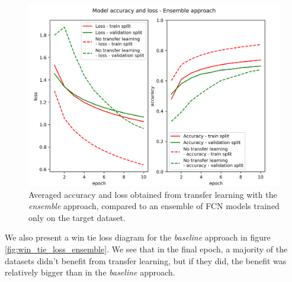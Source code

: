 \documentclass[a4paper,11pt,twoside]{report}
\theoremstyle{definition}
\begin{document}
\begin{figure}[h!t]
\centering
\includegraphics[width=17 cm]{imgs/ensemble/loss_acc.png}
\caption{Averaged accuracy and loss obtained from transfer learning with the \textit{ensemble} approach, compared to an ensemble of FCN models trained only on the target dataset.}
\label{fig:ensemble_acc}
\end{figure}
\FloatBarrier
We also present a win tie loss diagram for the \textit{baseline} approach in figure \ref{fig:win_tie_loss_ensemble}. We see that in the final epoch, a majority of the datasets didn't benefit from transfer learning, but if they did, the benefit was relatively bigger than in the \textit{baseline} approach.
\end{document}
